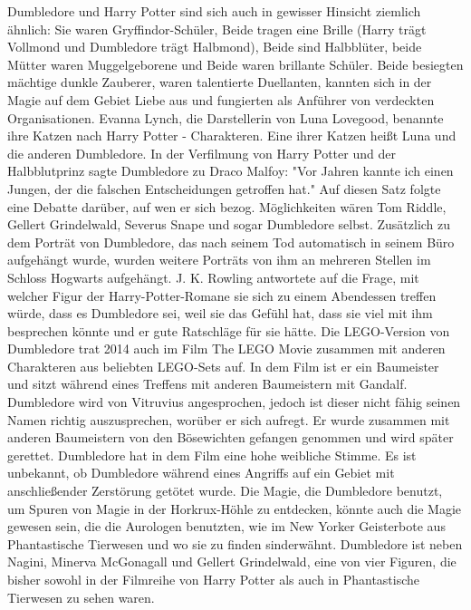 \documentclass[a4paper, 10pt]{article}
\begin{document}
\vspace{10pt}
\newline
Dumbledore und Harry Potter sind sich auch in gewisser Hinsicht ziemlich ähnlich: Sie waren Gryffindor-Schüler, Beide tragen eine Brille (Harry trägt Vollmond und Dumbledore trägt Halbmond), Beide sind Halbblüter, beide Mütter waren Muggelgeborene und Beide waren brillante Schüler. Beide besiegten mächtige dunkle Zauberer, waren talentierte Duellanten, kannten sich in der Magie auf dem Gebiet Liebe aus und fungierten als Anführer von verdeckten Organisationen.
\vspace{10pt}
\newline
Evanna Lynch, die Darstellerin von Luna Lovegood, benannte ihre Katzen nach Harry Potter - Charakteren. Eine ihrer Katzen heißt Luna und die anderen Dumbledore.
In der Verfilmung von Harry Potter und der Halbblutprinz sagte Dumbledore zu Draco Malfoy: "Vor Jahren kannte ich einen Jungen, der die falschen Entscheidungen getroffen hat." Auf diesen Satz folgte eine Debatte darüber, auf wen er sich bezog. Möglichkeiten wären Tom Riddle, Gellert Grindelwald, Severus Snape und sogar Dumbledore selbst.
\vspace{10pt}
\newline
Zusätzlich zu dem Porträt von Dumbledore, das nach seinem Tod automatisch in seinem Büro aufgehängt wurde, wurden weitere Porträts von ihm an mehreren Stellen im Schloss Hogwarts aufgehängt.
J. K. Rowling antwortete auf die Frage, mit welcher Figur der Harry-Potter-Romane sie sich zu einem Abendessen treffen würde, dass es Dumbledore sei, weil sie das Gefühl hat, dass sie viel mit ihm besprechen könnte und er gute Ratschläge für sie hätte.
\vspace{10pt}
\newline
Die LEGO-Version von Dumbledore trat 2014 auch im Film The LEGO Movie zusammen mit anderen Charakteren aus beliebten LEGO-Sets auf. In dem Film ist er ein Baumeister und sitzt während eines Treffens mit anderen Baumeistern mit Gandalf. Dumbledore wird von Vitruvius angesprochen, jedoch ist dieser nicht fähig seinen Namen richtig auszusprechen, worüber er sich aufregt. Er wurde zusammen mit anderen Baumeistern von den Bösewichten gefangen genommen und wird später gerettet. Dumbledore hat in dem Film eine hohe weibliche Stimme. Es ist unbekannt, ob Dumbledore während eines Angriffs auf ein Gebiet mit anschließender Zerstörung getötet wurde.
\vspace{10pt}
\newline
Die Magie, die Dumbledore benutzt, um Spuren von Magie in der Horkrux-Höhle zu entdecken, könnte auch die Magie gewesen sein, die die Aurologen benutzten, wie im New Yorker Geisterbote aus Phantastische Tierwesen und wo sie zu finden sinderwähnt.
Dumbledore ist neben Nagini, Minerva McGonagall und Gellert Grindelwald, eine von vier Figuren, die bisher sowohl in der Filmreihe von Harry Potter als auch in Phantastische Tierwesen zu sehen waren.
\end{document}
